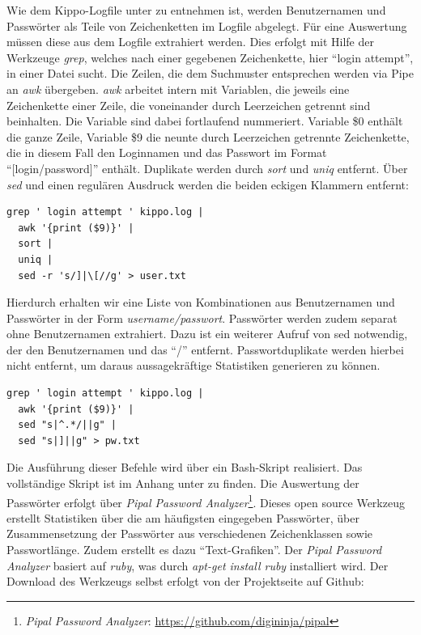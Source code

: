 Wie dem Kippo-Logfile unter \textit{} zu entnehmen ist, werden Benutzernamen und Passwörter als Teile von Zeichenketten im Logfile abgelegt. Für eine Auswertung müssen diese aus dem Logfile extrahiert werden. Dies erfolgt mit Hilfe der Werkzeuge \textit{grep}, welches nach  einer gegebenen Zeichenkette, hier "`login attempt"', in einer Datei sucht. Die Zeilen, die dem Suchmuster entsprechen werden via Pipe an \textit{awk} übergeben. \textit{awk} arbeitet intern mit Variablen, die jeweils eine Zeichenkette einer Zeile, die voneinander durch Leerzeichen getrennt sind beinhalten. Die Variable sind dabei fortlaufend nummeriert. Variable \$0 enthält die ganze Zeile, Variable \$9 die neunte durch Leerzeichen getrennte Zeichenkette, die in diesem Fall den Loginnamen und das Passwort im Format "`[login/password]"' enthält. Duplikate werden durch \textit{sort} und \textit{uniq} entfernt. Über \textit{sed} und einen regulären Ausdruck werden die beiden eckigen Klammern entfernt:



\begin{lstlisting}[style=customc]
grep ' login attempt ' kippo.log |
  awk '{print ($9)}' |
  sort |
  uniq |
  sed -r 's/]|\[//g' > user.txt

\end{lstlisting}

Hierdurch erhalten wir eine Liste von Kombinationen aus Benutzernamen und Passwörter in der Form \textit{username/passwort}. Passwörter werden zudem separat ohne Benutzernamen extrahiert. Dazu ist ein weiterer Aufruf von sed notwendig, der den Benutzernamen und das "`/"' entfernt. Passwortduplikate werden hierbei nicht entfernt, um daraus aussagekräftige Statistiken generieren zu können.

\begin{lstlisting}[style=customc]
grep ' login attempt ' kippo.log |
  awk '{print ($9)}' |
  sed "s|^.*/||g" |
  sed "s|]||g" > pw.txt
\end{lstlisting}

Die Ausführung dieser Befehle wird über ein Bash-Skript realisiert. Das vollständige Skript ist im Anhang unter \textit{} zu finden.
Die Auswertung der Passwörter erfolgt über \textit{Pipal Password Analyzer}\footnote{ \textit{Pipal Password Analyzer}: \url{https://github.com/digininja/pipal}}. Dieses open source Werkzeug erstellt Statistiken über die am häufigsten eingegeben Passwörter, über Zusammensetzung der Passwörter aus verschiedenen Zeichenklassen sowie Passwortlänge. Zudem erstellt es dazu "`Text-Grafiken"'. Der \textit{Pipal Password Analyzer} basiert auf \textit{ruby}, was durch \textit{apt-get install ruby} installiert wird. Der Download des Werkzeugs selbst erfolgt von der Projektseite auf Github:

